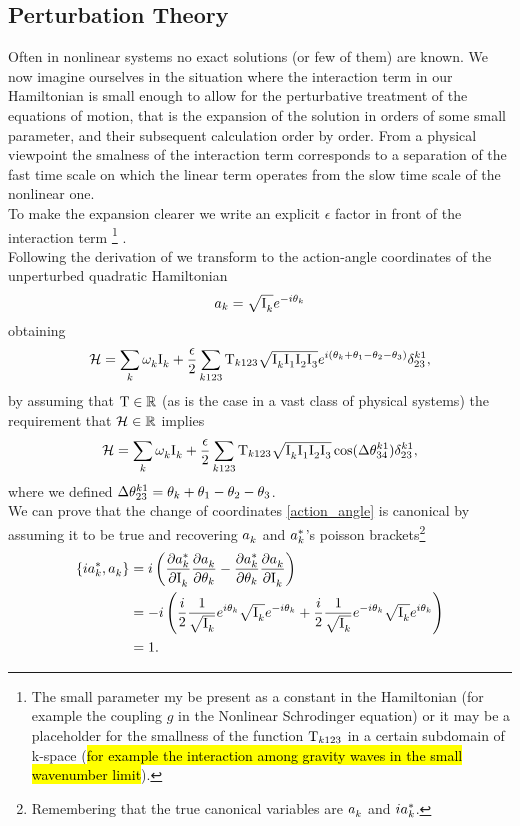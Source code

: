 \subsection{Perturbation Theory}

Often in nonlinear systems no exact solutions (or few of them) are known. We now imagine ourselves in the situation where the interaction term in our Hamiltonian 
is small enough to allow for the perturbative treatment of the equations of motion, that is the expansion of the solution in orders of some small parameter, 
and their subsequent calculation order by order. From a physical viewpoint the smalness of the interaction term corresponds to a 
separation of the fast time scale on which the linear term operates from the slow time scale of the nonlinear one.\\
 To make the expansion clearer we write an explicit $\epsilon$ factor in front of the interaction term
\footnote{The small parameter my be present as a constant in the Hamiltonian (for example the coupling $g$ in the Nonlinear Schrodinger equation) or 
it may be a placeholder for the smallness of the function $\mathrm{T}_{k123}$ in a certain subdomain of k-space (\hl{for example the interaction among gravity waves in 
the small wavenumber limit}). } . \\

Following the derivation of \cite{Onorato2020} we transform to the action-angle coordinates of the unperturbed quadratic Hamiltonian
\begin{equation}
    a_k = \sqrt{\mathrm{I}^{}_k}e^{-i\theta_k}
    \label{action_angle}
\end{equation} 
obtaining 
\begin{equation}
    \mathcal{H} = \sum_k \omega^{}_k \mathrm{I}^{}_k + \frac{\epsilon}{2} \sum_{k123}\mathrm{T}_{k123}\sqrt{\mathrm{I}^{}_k\mathrm{I}^{}_1\mathrm{I}^{}_2\mathrm{I}^{}_3}e^{i(\theta_k + \theta_1 - \theta_2 - \theta_3)}\delta^{k1}_{23},
\end{equation}
by assuming that $\mathrm{T} \in \mathbb{R}$ (as is the case in a vast class of physical systems) the requirement that $\mathcal{H} \in \mathbb{R}$ implies 
\begin{equation}
    \mathcal{H} = \sum_k \omega^{}_k \mathrm{I}^{}_k + \frac{\epsilon}{2} \sum_{k123}\mathrm{T}_{k123}\sqrt{\mathrm{I}^{}_k\mathrm{I}^{}_1\mathrm{I}^{}_2\mathrm{I}^{}_3}\cos(\Delta\theta^{k1}_{34})\delta^{k1}_{23},
\end{equation}
where we defined $\Delta\theta^{k1}_{23}=\theta_k + \theta_1 - \theta_2 - \theta_3$. \\
We can prove that the change of coordinates \eqref{action_angle} is canonical by assuming it to be true and recovering $a_k^{}$ and $a_k^{*}$'s poisson 
brackets\footnote{Remembering that the true canonical variables are $a_k^{}$ and $ia_k^{*}$.} 
\begin{align}
    \left\{ ia_k^{*}, a_k^{} \right\} &= i \left( \frac{\partial a_k^{*}}{\partial \mathrm{I}^{}_k}\frac{\partial a_k^{}}{\partial \theta_k}  -
    \frac{\partial a_k^{*}}{\partial \theta_k}\frac{\partial a_k^{}}{\partial \mathrm{I}^{}_k}  \right) \\
    &= - i \left( \frac{i}{2} \frac{1}{\sqrt{\mathrm{I}^{}_k}}e^{i\theta_k}\sqrt{\mathrm{I}^{}_k}e^{-i\theta_k} + 
    \frac{i}{2} \frac{1}{\sqrt{\mathrm{I}^{}_k}}e^{-i\theta_k}\sqrt{\mathrm{I}^{}_k}e^{i\theta_k}\right) \\
    &= 1 .
\end{align} 

